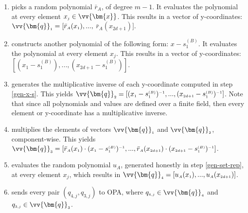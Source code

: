\begin{enumerate}[label=(\roman*)]
\item\label{Set-Manipulation::pick-rand-poly}  picks a random polynomial $\bar{r}_{\scriptscriptstyle A}$, of degree $m-1$. It evaluates the polynomial at every element  $x_{\scriptscriptstyle j}\in \vv{\bm{x}}$. This results in a vector of y-coordinates: $\vv{\bm{q}}_{\scriptscriptstyle 1}=[\bar{r}_{\scriptscriptstyle A}(x_{\scriptscriptstyle 1}),...,$ $ \bar{r}_{\scriptscriptstyle A}(x_{\scriptscriptstyle 2d+1})]$.
\item\label{gen-x-s}  constructs another polynomial of the following form: $x-s^{\scriptscriptstyle(B)}_{\scriptscriptstyle 1}$. It evaluates the polynomial at every element  $x_{\scriptscriptstyle j}$. This results in a vector of y-coordinates: $[(x_{\scriptscriptstyle 1}-s^{\scriptscriptstyle(B)}_{\scriptscriptstyle 1}), ..., (x_{\scriptscriptstyle 2d+1}-s^{\scriptscriptstyle(B)}_{\scriptscriptstyle 1})]$.
\item\label{Set-Manipulation::gen-mul-inverse} generates the multiplicative inverse of each y-coordinate computed in  step \ref{gen-x-s}. This yields  $\vv{\bm{q}}_{\scriptscriptstyle 2}=[(x_{\scriptscriptstyle 1}-s^{\scriptscriptstyle(B)}_{\scriptscriptstyle 1})^{\scriptscriptstyle -1}, ..., (x_{\scriptscriptstyle 2d+1}-s^{\scriptscriptstyle(B)}_{\scriptscriptstyle 1})^{\scriptscriptstyle -1}]$. Note that since all polynomials and values are defined over a finite field, then every element or y-coordinate has a multiplicative inverse. 
\item\label{Set-Manipulation::multipl-vect} multiplies the elements of vectors $\vv{\bm{q}}_{\scriptscriptstyle 1}$ and $\vv{\bm{q}}_{\scriptscriptstyle 2}$, component-wise. This yields $\vv{\bm{q}}_{\scriptscriptstyle 3}=[\bar{r}_{\scriptscriptstyle A}(x_{\scriptscriptstyle 1})\cdot(x_{\scriptscriptstyle 1}-s^{\scriptscriptstyle(B)}_{\scriptscriptstyle 1})^{\scriptscriptstyle -1},..., \bar{r}_{\scriptscriptstyle A}(x_{\scriptscriptstyle 2d+1})\cdot (x_{\scriptscriptstyle 2d+1}-s^{\scriptscriptstyle(B)}_{\scriptscriptstyle 1})^{\scriptscriptstyle -1}]$.
\item\label{Set-Manipulation::eval-u}  evaluates the random polynomial $u_{\scriptscriptstyle A}$, generated honestly in step \ref{gen-set-rep}, at every element $x_{\scriptscriptstyle j}$, which results in $\vv{\bm{q}}_{\scriptscriptstyle 4}=[u_{\scriptscriptstyle A}(x_{\scriptscriptstyle 1}),..., u_{\scriptscriptstyle A}(x_{\scriptscriptstyle 2d+1})]$. 


\item\label{Set-Manipulation::send} sends every pair $(q_{\scriptscriptstyle 4,j}, q_{\scriptscriptstyle 3,j})$ to OPA, where $q_{\scriptscriptstyle 4,j}\in \vv{\bm{q}}_{\scriptscriptstyle 4}$ and  $q_{\scriptscriptstyle 3,j}\in \vv{\bm{q}}_{\scriptscriptstyle 3}$. 
\end{enumerate}

